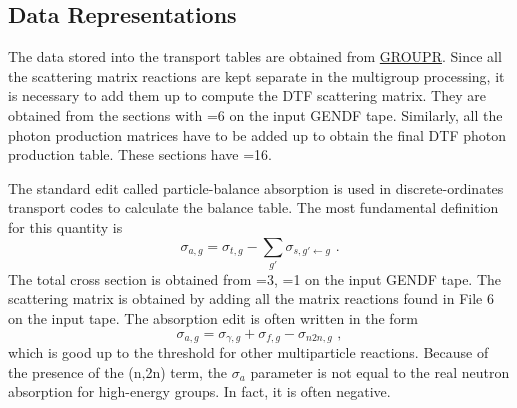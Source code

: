 \begin{table}
\begin{verbatim}
\end{verbatim}
\label{ctable}
\end{table}

\subsection{Data Representations}
\label{ssDataRep}

The data stored into the transport tables are obtained from
\hyperlink{sGROUPRhy}{GROUPR}.  Since
all the scattering matrix reactions are
kept separate in the multigroup processing, it is necessary to add
them up to compute the DTF scattering matrix.  They are obtained from
the sections with =6 on the input GENDF tape.  Similarly,
all the photon production matrices have to be added up to obtain the
final DTF photon production table.  These sections have =16.

\newpage
The standard edit called particle-balance absorption is used in
discrete-ordinates transport codes to calculate the balance table.
The most fundamental definition for this quantity is
\begin{equation}
   \sigma_{a,g} = \sigma_{t,g} - \displaystyle\sum_{g'}
      \sigma_{s,g'{\leftarrow}g}\,\,.
\label{abs}
\end{equation}
The total cross section is obtained from =3, =1
on the input GENDF
tape.  The scattering matrix is obtained by adding all the matrix
reactions found in File 6 on the input tape.  The absorption edit
is often written in the form
\begin{equation}
   \sigma_{a,g} = \sigma_{\gamma,g} + \sigma_{f,g}
         - \sigma_{n2n,g}\,\,,
\end{equation}
which is good up to the threshold for other multiparticle reactions.
Because of the presence of the (n,2n) term, the $\sigma_a$ parameter
is not equal to the real neutron absorption for high-energy groups.
In fact, it is often negative.

